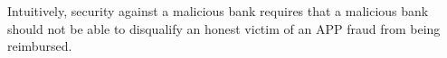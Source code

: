 Intuitively, security against a malicious bank requires that a malicious bank should not be able to disqualify an honest victim of an APP fraud from being reimbursed. %



